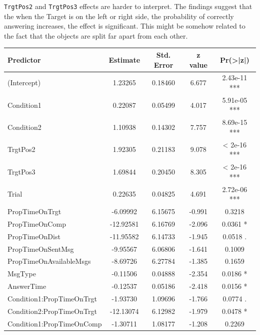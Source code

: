\texttt{TrgtPos2} and \texttt{TrgtPos3} effects are harder to interpret. The findings suggest that the when the Target is on the left or right side, the probability of correctly answering increases, the effect is significant. This might be somehow related to the fact that the objects are split far apart from each other.

\begin{table}[h!]
\centering
\begin{tabular}{|l|c|c|c|c|}
\hline
\textbf{Predictor} & \textbf{Estimate} & \textbf{Std. Error} & \textbf{z value} & \textbf{Pr(>|z|)} \\ \hline
(Intercept)                          & 1.23265 & 0.18460 & 6.677 & 2.43e-11 *** \\ \hline
Condition1                           & 0.22087 & 0.05499 & 4.017 & 5.91e-05 *** \\ \hline
Condition2                           & 1.10938 & 0.14302 & 7.757 & 8.69e-15 *** \\ \hline
TrgtPos2                             & 1.92305 & 0.21183 & 9.078 & < 2e-16 *** \\ \hline
TrgtPos3                             & 1.69844 & 0.20450 & 8.305 & < 2e-16 *** \\ \hline
Trial                                & 0.22635 & 0.04825 & 4.691 & 2.72e-06 *** \\ \hline
PropTimeOnTrgt                      & -6.09992 & 6.15675 & -0.991 & 0.3218 \\ \hline
PropTimeOnComp                     & -12.92581 & 6.16769 & -2.096 & 0.0361 * \\ \hline
PropTimeOnDist                     & -11.95582 & 6.14733 & -1.945 & 0.0518 . \\ \hline
PropTimeOnSentMsg                   & -9.95567 & 6.06806 & -1.641 & 0.1009 \\ \hline
PropTimeOnAvailableMsgs             & -8.69726 & 6.27784 & -1.385 & 0.1659 \\ \hline
MsgType                            & -0.11506 & 0.04888 & -2.354 & 0.0186 * \\ \hline
AnswerTime                          & -0.12537 & 0.05186 & -2.418 & 0.0156 * \\ \hline
Condition1:PropTimeOnTrgt           & -1.93730 & 1.09696 & -1.766 & 0.0774 . \\ \hline
Condition2:PropTimeOnTrgt          & -12.13074 & 6.12982 & -1.979 & 0.0478 * \\ \hline
Condition1:PropTimeOnComp           & -1.30711 & 1.08177 & -1.208 & 0.2269 \\ \hline

\end{tabular}
\end{table}
